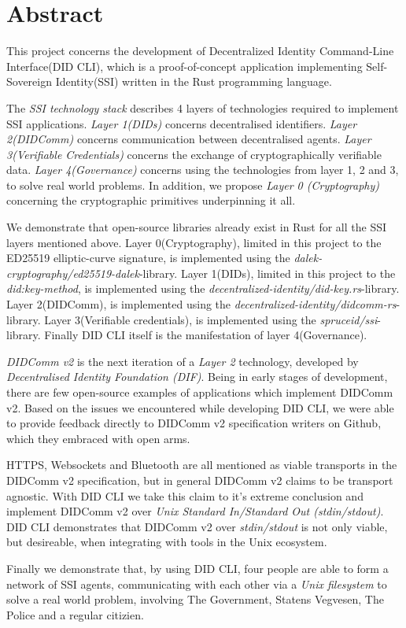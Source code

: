 \chapter*{Abstract}

This project concerns the development of Decentralized Identity Command-Line Interface(DID CLI), which is a proof-of-concept application implementing Self-Sovereign Identity(SSI) written in the Rust programming language.

The \textit{SSI technology stack} describes 4 layers of technologies required to implement SSI applications. \textit{Layer 1(DIDs)} concerns decentralised identifiers. \textit{Layer 2(DIDComm)} concerns communication between decentralised agents. \textit{Layer 3(Verifiable Credentials)} concerns the exchange of cryptographically verifiable data. \textit{Layer 4(Governance)} concerns using the technologies from layer 1, 2 and 3, to solve real world problems. In addition, we propose \textit{Layer 0 (Cryptography)} concerning the cryptographic primitives underpinning it all.


We demonstrate that open-source libraries already exist in Rust for all the SSI layers mentioned above. Layer 0(Cryptography), limited in this project to the ED25519 elliptic-curve signature, is implemented using the \textit{dalek-cryptography/ed25519-dalek}-library. Layer 1(DIDs), limited in this project to the \textit{did:key-method}, is implemented using the \textit{decentralized-identity/did-key.rs}-library. Layer 2(DIDComm), is implemented using the \textit{decentralized-identity/didcomm-rs}-library. Layer 3(Verifiable credentials), is implemented using the \textit{spruceid/ssi}-library. Finally DID CLI itself is the manifestation of layer 4(Governance).


\textit{DIDComm v2} is the next iteration of a \textit{Layer 2} technology, developed by \textit{Decentralised Identity Foundation (DIF)}. Being in early stages of development, there are few open-source examples of applications which implement DIDComm v2. Based on the issues we encountered while developing DID CLI, we were able to provide feedback directly to DIDComm v2 specification writers on Github, which they embraced with open arms.


HTTPS, Websockets and Bluetooth are all mentioned as viable transports in the DIDComm v2 specification, but in general DIDComm v2 claims to be transport agnostic. With DID CLI we take this claim to it's extreme conclusion and implement DIDComm v2 over \textit{Unix Standard In/Standard Out (stdin/stdout)}. DID CLI demonstrates that DIDComm v2 over \textit{stdin/stdout} is not only viable, but desireable, when integrating with tools in the Unix ecosystem. 

Finally we demonstrate that, by using DID CLI, four people are able to form a network of SSI agents, communicating with each other via a \textit{Unix filesystem} to solve a real world problem, involving The Government, Statens Vegvesen, The Police and a regular citizien.